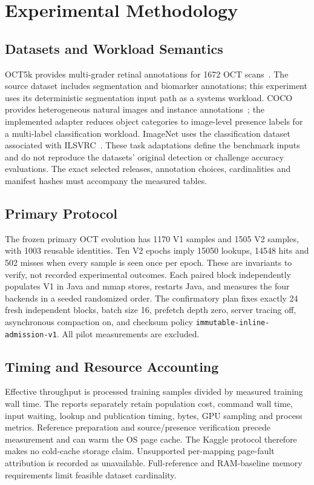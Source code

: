 \documentclass[journal]{IEEEtran}
\begin{document}
\section{Experimental Methodology}
\subsection{Datasets and Workload Semantics}
OCT5k provides multi-grader retinal annotations for 1672 OCT scans~\cite{oct5k}. The source dataset includes segmentation and biomarker annotations; this experiment uses its deterministic segmentation input path as a systems workload. COCO provides heterogeneous natural images and instance annotations~\cite{coco}; the implemented adapter reduces object categories to image-level presence labels for a multi-label classification workload. ImageNet uses the classification dataset associated with ILSVRC~\cite{imagenet}. These task adaptations define the benchmark inputs and do not reproduce the datasets' original detection or challenge accuracy evaluations. The exact selected releases, annotation choices, cardinalities and manifest hashes must accompany the measured tables.

\subsection{Primary Protocol}
The frozen primary OCT evolution has 1170 V1 samples and 1505 V2 samples, with 1003 reusable identities. Ten V2 epochs imply 15050 lookups, 14548 hits and 502 misses when every sample is seen once per epoch. These are invariants to verify, not recorded experimental outcomes. Each paired block independently populates V1 in Java and mmap stores, restarts Java, and measures the four backends in a seeded randomized order. The confirmatory plan fixes exactly 24 fresh independent blocks, batch size 16, prefetch depth zero, server tracing off, asynchronous compaction on, and checksum policy \texttt{immutable-inline-admission-v1}. All pilot measurements are excluded.

\subsection{Timing and Resource Accounting}
Effective throughput is processed training samples divided by measured training wall time. The reports separately retain population cost, command wall time, input waiting, lookup and publication timing, bytes, GPU sampling and process metrics. Reference preparation and source/presence verification precede measurement and can warm the OS page cache. The Kaggle protocol therefore makes no cold-cache storage claim. Unsupported per-mapping page-fault attribution is recorded as unavailable. Full-reference and RAM-baseline memory requirements limit feasible dataset cardinality.
\end{document}
